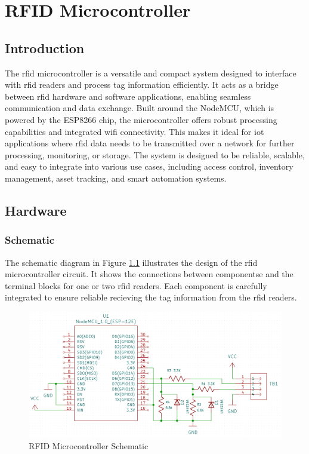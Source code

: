 \chapter{RFID Microcontroller}
\section{Introduction}
The \gls{rfid} microcontroller is a versatile and compact system designed to interface with \gls{rfid} readers and process tag information efficiently. It acts as a bridge between \gls{rfid} 
hardware and software applications, enabling seamless communication and data exchange. Built around the NodeMCU, which is powered by the ESP8266 chip, the microcontroller 
offers robust processing capabilities and integrated \gls{wifi} connectivity. This makes it ideal for \gls{iot} applications where \gls{rfid} data needs to be transmitted over a network for further 
processing, monitoring, or storage. The system is designed to be reliable, scalable, and easy to integrate into various use cases, including access control, inventory management, asset tracking, 
and smart automation systems.
\section{Hardware}
\subsection{Schematic}
The schematic diagram in Figure \ref{fig:rfid-schematic} illustrates the design of the \gls{rfid} microcontroller circuit. It shows the connections between componentse and the terminal blocks for one or two \gls{rfid} readers. 
Each component is carefully integrated to ensure reliable recieving the tag information from the \gls{rfid} readers.

\begin{figure}[H]
  \centering
    \includegraphics[scale=0.2]{rfid_schematic.png}
  \caption{RFID Microcontroller Schematic}
  \label{fig:rfid-schematic}
\end{figure}

